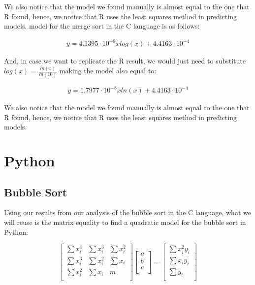 \documentclass[]{report}
\begin{document}
				We also notice that the model we found manually is almost equal to the one that R found, hence, we notice that R uses the least squares method in predicting models. model for the merge sort in the C language is as follows:
				
				\begin{ceqn}
					\begin{align}
		 				y = 4.1395\cdot10^{-8}xlog(x) + 4.4163\cdot10^{-4}
					\end{align}
				\end{ceqn}
				And, in case we want to replicate the R result, we would just need to substitute $log(x)$ = $\frac{ln(x)}{ln(10)}$ making the model also equal to:
				\begin{ceqn}
					\begin{align}
		 				y = 1.7977\cdot10^{-8}xln(x) + 4.4163\cdot10^{-4}
					\end{align}
				\end{ceqn}
				
				We also notice that the model we found manually is almost equal to the one that R found, hence, we notice that R uses the least squares method in predicting models.
		 		

		 	\section{Python}
		 		\subsection{Bubble Sort}
		 		Using our results from our analysis of the bubble sort in the C language, what we will reuse is the matrix equality to find a quadratic model for the bubble sort in Python:
		 		
				\begin{equation}
						\begin{bmatrix}
						\sum x_i^4 & \sum x_i^3 & \sum x_i^2 \\
						\sum x_i^3 & \sum x_i^2 & \sum x_i \\
						\sum x_i^2 & \sum x_i & m \\
						\end{bmatrix}
						\begin{bmatrix}
						a \\
						b \\
						c \\
						\end{bmatrix}
						=
						\begin{bmatrix}
						\sum x_i^2y_i \\
						\sum x_iy_i \\
						\sum y_i \\
						\end{bmatrix}
				\end{equation}
				
\end{document}
